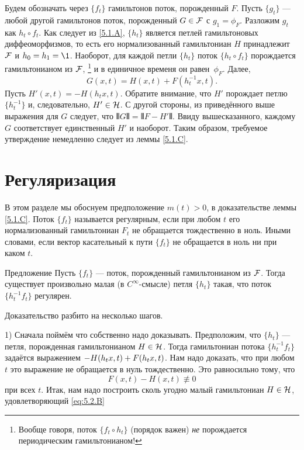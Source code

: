 Будем обозначать через $\{f_t\}$ гамильтонов поток, порожденный $F$.
Пусть $\{g_t\}$ — любой другой гамильтонов поток, порожденный $G \in \mathcal{F}$ с $g_1 = \phi_F$.
Разложим $g_t$ как $h_t \circ f_t$.
Как следует из \ref{5.1.A}, $\{h_t\}$ является петлей гамильтоновых диффеоморфизмов, то есть его нормализованный гамильтониан $H$ принадлежит $\mathcal{F}$ и $h_0 = h_1 = \1$.
Наоборот, для каждой петли $\{h_t\}$ поток $\{h_t \circ f_t\}$ порождается гамильтонианом из $\mathcal{F}$,%
\footnote{Вообще говоря, поток $\{f_t \circ h_t\}$ (порядок важен) {}\emph{не} порождается периодическим гамильтонианом!}
и в единичное временя он равен~$\phi_F$.
Далее, 
\[G (x, t) = H (x, t) + F (h^{-1}_t x, t).\]
Пусть $H' (x, t) = -H (h_t x, t)$.
Обратите внимание, что $H'$ порождает петлю $\{h^{-1}_t\}$ и, следовательно, $H'\in\mathcal{H}$.
С другой стороны, из приведённого выше выражения для $G$ следует, что $\VERT G \VERT = \VERT F - H' \VERT$.
Ввиду вышесказанного, каждому $G$ соответствует единственный $H'$ и наоборот.
Таким образом, требуемое утверждение немедленно следует из леммы \ref{5.1.C}.
\qeds

\section{Регуляризация}\label{5.2}

В этом разделе мы обоснуем предположение $m(t)>0$, в доказательстве леммы \ref{5.1.C}.
Поток $\{f_t\}$ называется регулярным, если при любом $t$ его нормализованный гамильтониан $F_t$ не обращается тождественно в ноль.
Иными словами, если вектор касательный к пути $\{f_t\}$ не
обращается в ноль ни при каком $t$.

\begin{thm}{Предложение}\label{5.2.A}
Пусть $\{f_t\}$ — поток, порожденный гамильтонианом из $\mathcal{F}$.
Тогда существует произвольно малая (в $C^\infty$-смысле) петля $\{h_t\}$ такая, что поток $\{h^{-1}_t f_t\}$ регулярен.
\end{thm}

Доказательство разбито на несколько шагов.

1) Сначала поймём что собственно надо доказывать.
Предположим, что $\{h_t\}$ — петля, порожденная гамильтонианом $H \in \mathcal{H}$.
Тогда гамильтониан потока $\{h^{-1}_t f_t\}$ задаётся выражением $-H (h_t x, t) \z+ F (h_t x, t)$.
Нам надо доказать, что при любом $t$ это выражение не обращается в нуль тождественно.
Это равносильно тому, что
\begin{equation}
F (x, t) - H (x, t) \not\equiv 0\label{eq:5.2.B}
\end{equation}
при всех $t$.
Итак, нам надо построить сколь угодно малый гамильтониан $H \in \mathcal{H}$, удовлетворяющий \ref{eq:5.2.B}

